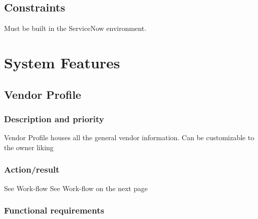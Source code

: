 \documentclass[10pt]{article}
\begin{document}
\subsection{Constraints}
Must be built in the ServiceNow environment.











\section{System Features}

\subsection{Vendor Profile}

\subsubsection{Description and priority}

Vendor Profile houses all the general vendor information. Can be customizable to the owner liking

\subsubsection{Action/result}

See Work-flow See Work-flow on the next page



\subsubsection{ Functional requirements}

\lipsum[10]

\end{document}
